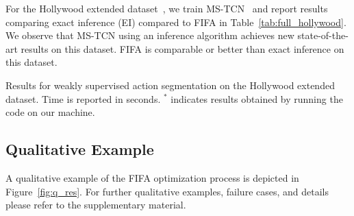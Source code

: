 For the Hollywood extended dataset~\cite{hollywoodextended}, we train MS-TCN~\cite{MS-TCN} and report results comparing exact inference (EI) compared to FIFA in Table~\ref{tab:full_hollywood}. We observe that MS-TCN using an inference algorithm achieves new state-of-the-art results on this dataset. FIFA is comparable or better than exact inference on this dataset.



\begin{table}
   \begin{minipage}{0.48\textwidth}
      \centering
      \caption{Results for weakly supervised action segmentation on the Hollywood extended dataset. Time is reported in seconds. $^*$ indicates results obtained by running the code on our machine.}
      \label{tab:weak_hollywood}
   \end{minipage}\hfill
   \begin{minipage}{0.48\textwidth}
      \centering
      \caption{Results for fully supervised action segmentation on the Hollywood extended dataset. EI stands for Exact Inference.}
      \label{tab:full_hollywood}
   \end{minipage}
\end{table}

\subsection{Qualitative Example}



A qualitative example of the FIFA optimization process is depicted in Figure~\ref{fig:q_res}. For further qualitative examples, failure cases, and details please refer to the supplementary material.




%

